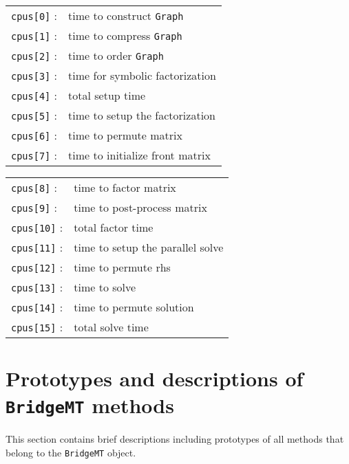 \begin{itemize}
\begin{itemize}
\begin{center}
\begin{tabular}{ll}
\texttt{cpus[0]} : & time to construct \texttt{Graph} \\
\texttt{cpus[1]} : & time to compress \texttt{Graph} \\
\texttt{cpus[2]} : & time to order \texttt{Graph} \\
\texttt{cpus[3]} : & time for symbolic factorization \\
\texttt{cpus[4]} : & total setup time \\
\texttt{cpus[5]} : & time to setup the factorization \\
\texttt{cpus[6]} : & time to permute matrix \\
\texttt{cpus[7]} : & time to initialize front matrix 
\end{tabular}
\begin{tabular}{ll}
\texttt{cpus[8]} : & time to factor matrix \\
\texttt{cpus[9]} : & time to post-process matrix \\
\texttt{cpus[10]} : & total factor time \\
\texttt{cpus[11]} : & time to setup the parallel solve \\
\texttt{cpus[12]} : & time to permute rhs \\
\texttt{cpus[13]} : & time to solve \\
\texttt{cpus[14]} : & time to permute solution \\
\texttt{cpus[15]} : & total solve time
\end{tabular}
\end{center}
\end{itemize}
\end{itemize}
\par
\section{Prototypes and descriptions of \texttt{BridgeMT} methods}
\label{section:BridgeMT:proto}
\par
This section contains brief descriptions including prototypes
of all methods that belong to the {\tt BridgeMT} object.
\par
